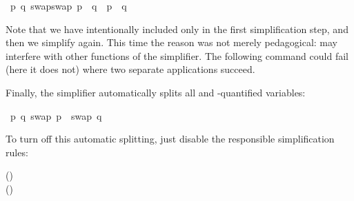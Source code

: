 \begin{isabellebody}
\isamarkupfalse%
\isamarkuptrue%
\isamarkupfalse%
\ {\isachardoublequote}{\isasymAnd}p\ q{\isachardot}\ swap{\isacharparenleft}swap\ p{\isacharparenright}\ {\isacharequal}\ q\ {\isasymlongrightarrow}\ p\ {\isacharequal}\ q{\isachardoublequote}\isanewline
\isamarkupfalse%
\isamarkupfalse%
\isamarkuptrue%
\isamarkupfalse%
\isamarkupfalse%
%
\begin{isamarkuptext}%
\noindent
Note that we have intentionally included only 
in the first simplification step, and then we simplify again. 
This time the reason was not merely
pedagogical:
 may interfere with other functions
of the simplifier.
The following command could fail (here it does not)
where two separate  applications succeed.%
\end{isamarkuptext}%
\isamarkuptrue%
\isamarkupfalse%
\isamarkupfalse%
\isamarkupfalse%
%
\begin{isamarkuptext}%
\noindent
Finally, the simplifier automatically splits all \isa{{\isasymforall}} and
\isa{{\isasymexists}}-quantified variables:%
\end{isamarkuptext}%
\isamarkuptrue%
\ {\isachardoublequote}{\isasymforall}p{\isachardot}\ {\isasymexists}q{\isachardot}\ swap\ p\ {\isacharequal}\ swap\ q{\isachardoublequote}\isanewline
\isamarkupfalse%
\isamarkupfalse%
%
\begin{isamarkuptext}%
\noindent
To turn off this automatic splitting, just disable the
responsible simplification rules:
\begin{center}
\hfill
()\\
\hfill
()
\end{center}%
\end{isamarkuptext}%
\isamarkuptrue%
\isamarkupfalse%
\end{isabellebody}%

